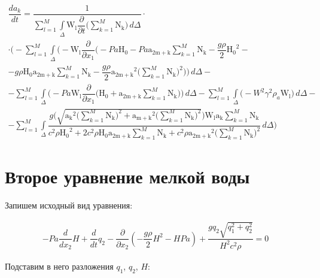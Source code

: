 \documentclass[14pt]{extreport}
\begin{document}
\begin{multline*}
\dfrac{da_{k}}{dt}=\dfrac{1}{\sum\limits_{l=1}^{M} \int\limits_{\Delta} \operatorname{W_{l}} \dfrac{\partial}{\partial t}\bigg(\sum\limits_{k=1}^{M} \operatorname{N_{k}}\bigg)\, d\Delta}\cdot \\ \cdot \bigg(- \sum_{l=1}^{M} \int\limits_{\Delta} \bigg(- \operatorname{W_{l}} \dfrac{\partial}{\partial x_{1}}\bigg(- Pa \operatorname{H_{0}} - Pa \operatorname{a_{2m+k}} \sum_{k=1}^{M} \operatorname{N_{k}} - \dfrac{g \rho}{2} \operatorname{H_{0}}^{2} -\\- g \rho \operatorname{H_{0}} \operatorname{a_{2m+k}} \sum_{k=1}^{M} \operatorname{N_{k}} - \dfrac{g \rho}{2} \operatorname{a_{2m+k}}^{2} \bigg(\sum_{k=1}^{M} \operatorname{N_{k}}\bigg)^{2}\bigg)\bigg)\, d\Delta -\\- \sum_{l=1}^{M} \int\limits_{\Delta} \bigg(- Pa \operatorname{W_{l}} \dfrac{\partial}{\partial x_{1}}\bigg(\operatorname{H_{0}} + \operatorname{a_{2m+k}} \sum_{k=1}^{M} \operatorname{N_{k}}\bigg)\bigg)\, d\Delta - \sum_{l=1}^{M} \int\limits_{\Delta} \bigg(- W^{2} \gamma^{2} \rho_{a} \operatorname{W_{l}}\bigg)\, d\Delta  -\\- \sum_{l=1}^{M} \int\limits_{\Delta} \dfrac{g \bigg(\sqrt{\operatorname{a_{k}}^{2} \bigg(\sum\limits_{k=1}^{M} \operatorname{N_{k}}\bigg)^{2} + \operatorname{a_{m+k}}^{2} \bigg(\sum\limits_{k=1}^{M} \operatorname{N_{k}}\bigg)^{2}}\bigg) \operatorname{W_{l}} \operatorname{a_{k}} \sum\limits_{k=1}^{M} \operatorname{N_{k}}}{c^{2} \rho \operatorname{H_{0}}^{2} + 2 c^{2} \rho \operatorname{H_{0}} \operatorname{a_{2m+k}} \sum\limits_{k=1}^{M} \operatorname{N_{k}} + c^{2} \rho \operatorname{a_{2m+k}}^{2} \bigg(\sum\limits_{k=1}^{M} \operatorname{N_{k}}\bigg)^{2}}\, d\Delta\bigg)
\end{multline*}

\section{Второе уравнение мелкой воды}

Запишем исходный вид уравнения:

\begin{multline*}
- Pa \dfrac{d}{d x_{2}} H + \dfrac{d}{d t} q_{2} - \dfrac{\partial}{\partial x_{2}}\left(- \dfrac{g \rho}{2} H^{2} - H Pa\right) + \dfrac{g q_{2} \sqrt{q_{1}^{2} + q_{2}^{2}}}{H^{2} c^{2} \rho} = 0
\end{multline*}


Подставим в него разложения $q_1$, $q_2$, $H$:
\end{document}
